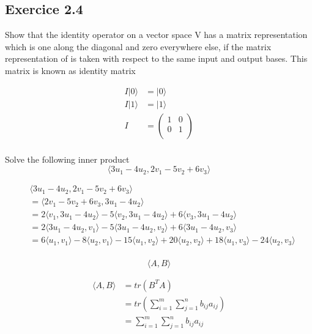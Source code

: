 \documentclass{article}
\begin{document}
\subsection{Exercice 2.4}

Show that the identity operator on a vector space V has a matrix representation which is
one along the diagonal and zero everywhere else, if the matrix representation of is taken with respect to the
same input and output bases. This matrix is known as identity matrix

\begin{equation}
    \begin{split}
        I|0\rangle & = |0\rangle \\
        I|1\rangle & = |1\rangle \\
        I & = \begin{pmatrix}
            1 & 0 \\
            0 & 1 \\
        \end{pmatrix} \\
    \end{split}
\end{equation}

Solve the following inner product
\begin{equation}
    \langle3u_1 - 4u_2, 2v_1 - 5v_2 + 6v_3\rangle
\end{equation}

\begin{equation}
    \begin{split}
        & \langle3u_1 - 4u_2, 2v_1 - 5v_2 + 6v_3\rangle \\
        & = \langle2v_1 - 5v_2 + 6v_3, 3u_1 - 4u_2\rangle \\
        & = 2\langle v_1, 3u_1 - 4u_2\rangle
            - 5\langle v_2, 3u_1 - 4u_2\rangle
            + 6\langle v_3, 3u_1 - 4u_2\rangle \\
        & = 2\langle 3u_1 - 4u_2, v_1 \rangle
            - 5\langle 3u_1 - 4u_2, v_2 \rangle
            + 6\langle 3u_1 - 4u_2, v_3 \rangle \\
        & = 6\langle u_1, v_1 \rangle - 8\langle u_2, v_1 \rangle
            - 15\langle u_1, v_2 \rangle + 20\langle u_2, v_2 \rangle
            + 18\langle u_1, v_3 \rangle - 24\langle u_2, v_3 \rangle \\
    \end{split}
\end{equation}

\begin{equation}
    \langle A, B \rangle
\end{equation}

\begin{equation}
    \begin{split}
        \langle A, B \rangle & = tr(B^TA) \\
        & = tr(\sum_{i=1}^{m} \sum_{j=1}^{n} b_{ij}a_{ij}) \\
        & = \sum_{i=1}^{m} \sum_{j=1}^{n} b_{ij}a_{ij} \\
    \end{split}
\end{equation}
\end{document}
